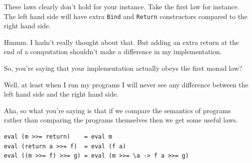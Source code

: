 \begin{dialogue}
\speak{\docname{}} These laws clearly don't hold for your instance. Take the
first law for instance. The left hand side will have extra \texttt{Bind} and
\texttt{Return} constructors compared to the right hand side.

\speak{\studname{}} Hmmm. I hadn't really thought about that. But adding an
extra return at the end of a computation shouldn't make a difference
in my implementation.

\speak{\docname{}} So, you're saying that your implementation actually obeys
the first monad law?

\speak{\studname{}} Well, at least when I run my programs I will never see
any difference between the left hand side and the right hand side.

\speak{\docname{}} Aha, so what you're saying is that if we compare the
semantics of programs rather than comparing the programs themselves
then we get some useful laws. 

\end{dialogue}

\begin{small}
\begin{verbatim}
eval (m >>= return)    = eval m
eval (return a >>= f)  = eval (f a)
eval ((m >>= f) >>= g) = eval (m >>= \a -> f a >>= g)
\end{verbatim}
\end{small}

